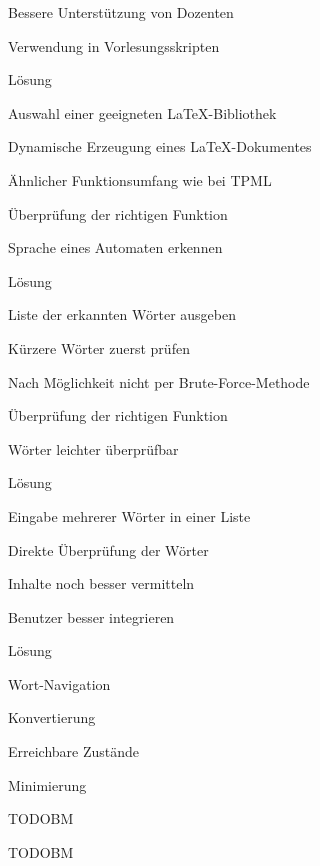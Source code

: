 {
    \begin{itemgroup}{}
	\item Bessere Unterstützung von Dozenten
	\item Verwendung in Vorlesungsskripten
    \end{itemgroup}

    \begin{itemgroup}{Lösung}
	\item Auswahl einer geeigneten \LaTeX-Bibliothek
	\item Dynamische Erzeugung eines \LaTeX-Dokumentes
	\item Ähnlicher Funktionsumfang wie bei TPML
	\end{itemgroup}
    
    \vfill{}
}


{
    \begin{itemgroup}{}
	\item Überprüfung der richtigen Funktion
	\item Sprache eines Automaten erkennen 
    \end{itemgroup}

    \begin{itemgroup}{Lösung}
	\item Liste der erkannten Wörter ausgeben
	\item Kürzere Wörter zuerst prüfen
	\item Nach Möglichkeit nicht per Brute-Force-Methode
	\end{itemgroup}
    
    \vfill{}
}


{
    \begin{itemgroup}{}
	\item Überprüfung der richtigen Funktion
	\item Wörter leichter überprüfbar
    \end{itemgroup}

    \begin{itemgroup}{Lösung}
	\item Eingabe mehrerer Wörter in einer Liste
	\item Direkte Überprüfung der Wörter
	\end{itemgroup}
    
    \vfill{}
}


{
    \begin{itemgroup}{}
	\item Inhalte noch besser vermitteln
	\item Benutzer besser integrieren
    \end{itemgroup}

    \begin{itemgroup}{Lösung}
	\item Wort-Navigation
	\item Konvertierung
	\item Erreichbare Zustände
	\item Minimierung
	\end{itemgroup}
    
    \vfill{}
}


{
    TODOBM
    
    \vfill{}
}


{
    TODOBM
    
    \vfill{}
}


